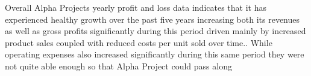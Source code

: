  Overall Alpha Projects yearly profit and loss data indicates that it has experienced healthy growth over the past five years increasing both its revenues as well as gross profits significantly during this period driven mainly by increased product sales coupled with reduced costs per unit sold over time.. While operating expenses also increased significantly during this same period they were not quite able enough so that Alpha Project could pass along